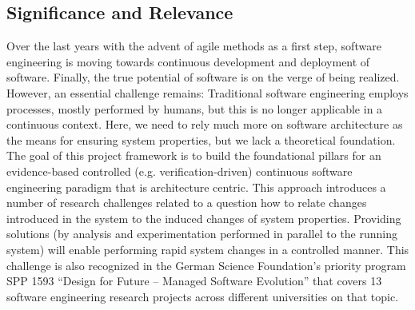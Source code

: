 \documentclass[12pt]{article}
\begin{document}
%
%
%
%
% 



\vspace{-.3cm}

\subsection{Significance and Relevance}
\vspace{-.2cm}

Over the last years with the advent of agile methods as a first step, software engineering is moving towards continuous development and deployment of software. Finally, the true potential of software is on the verge of being realized. However, an essential challenge remains: Traditional software engineering employs processes, mostly performed by humans, but this is no longer applicable in a continuous context. Here, we need to rely much more on software architecture as the means for ensuring system properties, but we lack a theoretical foundation. The goal of this project framework is to build the foundational pillars for an evidence-based 
controlled (e.g. verification-driven) continuous software engineering paradigm that is architecture centric. This approach introduces a number of research challenges related to a question how to relate changes introduced in the system to the induced changes of system properties. Providing solutions (by analysis and experimentation performed in parallel to the running system) will enable performing rapid system changes in a controlled manner. This challenge is also recognized in the German Science Foundation's priority program SPP 1593 ``Design for Future – Managed Software Evolution'' that covers 13 software engineering research projects across different universities on that topic.
\end{document}
